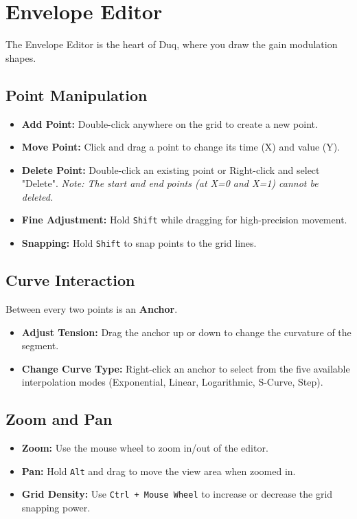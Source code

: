 \chapter{Envelope Editor}
\label{ch:envelope_editor}

The Envelope Editor is the heart of Duq, where you draw the gain modulation shapes.

\section{Point Manipulation}
\begin{itemize}
    \item \textbf{Add Point:} Double-click anywhere on the grid to create a new point.
    \item \textbf{Move Point:} Click and drag a point to change its time (X) and value (Y).
    \item \textbf{Delete Point:} Double-click an existing point or Right-click and select "Delete". \textit{Note: The start and end points (at X=0 and X=1) cannot be deleted.}
    \item \textbf{Fine Adjustment:} Hold \texttt{Shift} while dragging for high-precision movement.
    \item \textbf{Snapping:} Hold \texttt{Shift} to snap points to the grid lines.
\end{itemize}

\section{Curve Interaction}
Between every two points is an \textbf{Anchor}.
\begin{itemize}
    \item \textbf{Adjust Tension:} Drag the anchor up or down to change the curvature of the segment.
    \item \textbf{Change Curve Type:} Right-click an anchor to select from the five available interpolation modes (Exponential, Linear, Logarithmic, S-Curve, Step).
\end{itemize}

\section{Zoom and Pan}
\begin{itemize}
    \item \textbf{Zoom:} Use the mouse wheel to zoom in/out of the editor.
    \item \textbf{Pan:} Hold \texttt{Alt} and drag to move the view area when zoomed in.
    \item \textbf{Grid Density:} Use \texttt{Ctrl + Mouse Wheel} to increase or decrease the grid snapping power.
\end{itemize}
